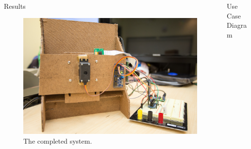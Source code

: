 \documentclass[final]{beamer}
\newlength{\onecolwid}
\newlength{\twocolwid}
\begin{document}
\begin{frame}[t]
\begin{columns}[t]
\begin{column}{\twocolwid}
\begin{columns}[t,totalwidth=\twocolwid]
\begin{column}{\onecolwid}
\begin{block}{Results}

\begin{figure}
\includegraphics[width=1\linewidth]{feeder}
\caption{The completed system.}
\end{figure}

\end{block}



\end{column} %

\begin{column}{\onecolwid}\vspace{-.6in} %



\begin{block}{Use Case Diagram}

\end{block}


\end{column}
\end{columns}
\end{column}
\end{columns}
\end{frame}
\end{document}
